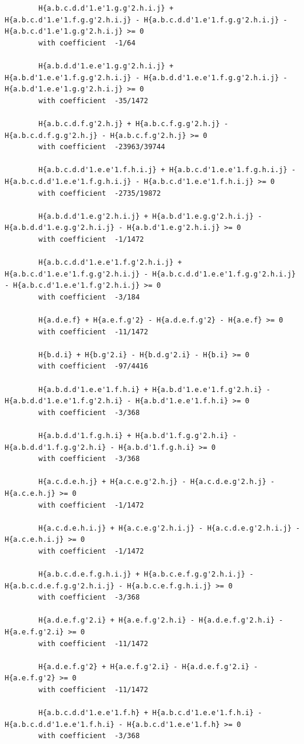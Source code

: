 \documentclass[11pt, a4paper]{kybernetika}
\begin{document}
\begin{verbatim}
		H{a.b.c.d.d'1.e'1.g.g'2.h.i.j} + H{a.b.c.d'1.e'1.f.g.g'2.h.i.j} - H{a.b.c.d.d'1.e'1.f.g.g'2.h.i.j} - H{a.b.c.d'1.e'1.g.g'2.h.i.j} >= 0
		with coefficient  -1/64
		
		H{a.b.d.d'1.e.e'1.g.g'2.h.i.j} + H{a.b.d'1.e.e'1.f.g.g'2.h.i.j} - H{a.b.d.d'1.e.e'1.f.g.g'2.h.i.j} - H{a.b.d'1.e.e'1.g.g'2.h.i.j} >= 0
		with coefficient  -35/1472
		
		H{a.b.c.d.f.g'2.h.j} + H{a.b.c.f.g.g'2.h.j} - H{a.b.c.d.f.g.g'2.h.j} - H{a.b.c.f.g'2.h.j} >= 0
		with coefficient  -23963/39744
		
		H{a.b.c.d.d'1.e.e'1.f.h.i.j} + H{a.b.c.d'1.e.e'1.f.g.h.i.j} - H{a.b.c.d.d'1.e.e'1.f.g.h.i.j} - H{a.b.c.d'1.e.e'1.f.h.i.j} >= 0
		with coefficient  -2735/19872
		
		H{a.b.d.d'1.e.g'2.h.i.j} + H{a.b.d'1.e.g.g'2.h.i.j} - H{a.b.d.d'1.e.g.g'2.h.i.j} - H{a.b.d'1.e.g'2.h.i.j} >= 0
		with coefficient  -1/1472
		
		H{a.b.c.d.d'1.e.e'1.f.g'2.h.i.j} + H{a.b.c.d'1.e.e'1.f.g.g'2.h.i.j} - H{a.b.c.d.d'1.e.e'1.f.g.g'2.h.i.j} - H{a.b.c.d'1.e.e'1.f.g'2.h.i.j} >= 0
		with coefficient  -3/184
		
		H{a.d.e.f} + H{a.e.f.g'2} - H{a.d.e.f.g'2} - H{a.e.f} >= 0
		with coefficient  -11/1472
		
		H{b.d.i} + H{b.g'2.i} - H{b.d.g'2.i} - H{b.i} >= 0
		with coefficient  -97/4416
		
		H{a.b.d.d'1.e.e'1.f.h.i} + H{a.b.d'1.e.e'1.f.g'2.h.i} - H{a.b.d.d'1.e.e'1.f.g'2.h.i} - H{a.b.d'1.e.e'1.f.h.i} >= 0
		with coefficient  -3/368
		
		H{a.b.d.d'1.f.g.h.i} + H{a.b.d'1.f.g.g'2.h.i} - H{a.b.d.d'1.f.g.g'2.h.i} - H{a.b.d'1.f.g.h.i} >= 0
		with coefficient  -3/368
		
		H{a.c.d.e.h.j} + H{a.c.e.g'2.h.j} - H{a.c.d.e.g'2.h.j} - H{a.c.e.h.j} >= 0
		with coefficient  -1/1472
		
		H{a.c.d.e.h.i.j} + H{a.c.e.g'2.h.i.j} - H{a.c.d.e.g'2.h.i.j} - H{a.c.e.h.i.j} >= 0
		with coefficient  -1/1472
		
		H{a.b.c.d.e.f.g.h.i.j} + H{a.b.c.e.f.g.g'2.h.i.j} - H{a.b.c.d.e.f.g.g'2.h.i.j} - H{a.b.c.e.f.g.h.i.j} >= 0
		with coefficient  -3/368
		
		H{a.d.e.f.g'2.i} + H{a.e.f.g'2.h.i} - H{a.d.e.f.g'2.h.i} - H{a.e.f.g'2.i} >= 0
		with coefficient  -11/1472
		
		H{a.d.e.f.g'2} + H{a.e.f.g'2.i} - H{a.d.e.f.g'2.i} - H{a.e.f.g'2} >= 0
		with coefficient  -11/1472
		
		H{a.b.c.d.d'1.e.e'1.f.h} + H{a.b.c.d'1.e.e'1.f.h.i} - H{a.b.c.d.d'1.e.e'1.f.h.i} - H{a.b.c.d'1.e.e'1.f.h} >= 0
		with coefficient  -3/368
		

\end{verbatim}
\end{document}
